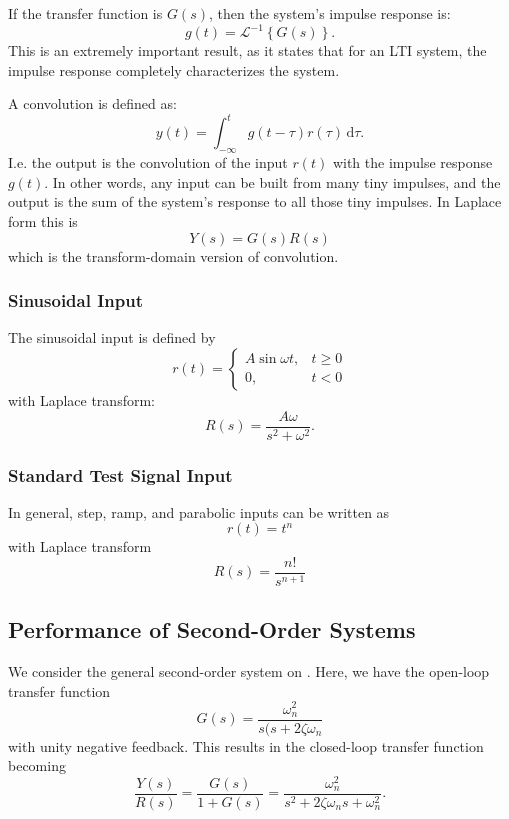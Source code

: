 If the transfer function is $G(s)$, then the system's impulse response is:
\begin{equation*}
  g(t) = \mathcal{L}^{-1} \left\{ G(s) \right\}
.\end{equation*}
This is an extremely important result, as it states that for an LTI system, the impulse response completely characterizes the system.

A convolution is defined as:
\begin{equation*}
  y(t) = \int_{-\infty}^{t} g(t-\tau) r(\tau) \, \mathrm{d}\tau
.\end{equation*}
I.e. the output is the convolution of the input $r(t)$ with the impulse response $g(t)$.
In other words, any input can be built from many tiny impulses, and the output is the sum of the system's response to all those tiny impulses.
In Laplace form this is
\begin{equation*}
  Y(s) = G(s) R(s)
\end{equation*}
which is the transform-domain version of convolution.

\subsubsection{Sinusoidal Input}
The sinusoidal input is defined by
\begin{equation*}
  r(t) = \begin{cases}
    A \sin \omega t, & t \geq 0\\
  0, & t <0
  \end{cases}
\end{equation*}
with Laplace transform:
\begin{equation*}
  R(s) = \frac{A\omega}{s^2  + \omega^2}
.\end{equation*}

\subsubsection{Standard Test Signal Input}
In general, step, ramp, and parabolic inputs can be written as
\begin{equation*}
  r(t) = t^{n}
\end{equation*}
with Laplace transform
\begin{equation*}
  R(s) = \frac{n!}{s^{n+1}}
\end{equation*}


\subsection{Performance of Second-Order Systems}
We consider the general second-order system on .
Here, we have the open-loop transfer function
\begin{equation*}
  G(s) = \frac{\omega_n^2}{s(s+ 2\zeta \omega_n}
\end{equation*}
with unity negative feedback.
This results in the closed-loop transfer function becoming
\begin{equation*}
  \frac{Y(s)}{R(s)} = \frac{G(s)}{1+ G(s)} = \frac{\omega_n^2}{s^2 + 2 \zeta \omega_n s + \omega_n^2}
.\end{equation*}

